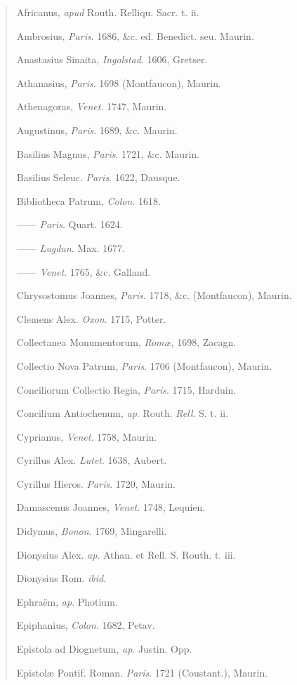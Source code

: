 \begin{quote}



Africanus, \emph{apud} Routh. Relliqu. Sacr. t. ii.

Ambrosius, \emph{Paris}. 1686, \&c. ed. Benedict. seu. Maurin.

Anastasius Sinaita, \emph{Ingolstad}. 1606, Gretser.

Athanasius, \emph{Paris}. 1698 (Montfaucon), Maurin.

Athenagoras, \emph{Venet}. 1747, Maurin.

Augustinus, \emph{Paris}. 1689, \&c. Maurin.

Basilius Magnus, \emph{Paris}. 1721, \&c. Maurin.

Basilius Seleuc. \emph{Paris}. 1622, Dausque.

Bibliotheca Patrum, \emph{Colon}. 1618.

—— \emph{Paris}. Quart. 1624.

—— \emph{Lugdun}. Max. 1677.

—— \emph{Venet}. 1765, \&c. Galland.

Chrysostomus Joannes, \emph{Paris}. 1718, \&c. (Montfaucon),
Maurin.

Clemens Alex. \emph{Oxon}. 1715, Potter.

Collectanea Monumentorum, \emph{Romæ}, 1698, Zacagn.

Collectio Nova Patrum, \emph{Paris}. 1706 (Montfaucon), Maurin.

Conciliorum Collectio Regia, \emph{Paris}. 1715, Harduin.

Concilium Antiochenum, \emph{ap}. Routh. \emph{Rell}. S. t. ii.

Cyprianus, \emph{Venet}. 1758, Maurin.

Cyrillus Alex. \emph{Lutet}. 1638, Aubert.

Cyrillus Hieros. \emph{Paris}. 1720, Maurin.

Damascenus Joannes, \emph{Venet}. 1748, Lequien.

Didymus, \emph{Bonon}. 1769, Mingarelli.

Dionysius Alex. \emph{ap}. Athan. et Rell. S. Routh. t. iii.

Dionysius Rom. \emph{ibid}.

Ephraëm, \emph{ap}. Photium.

Epiphanius, \emph{Colon}. 1682, Petav.

Epistola ad Diognetum, \emph{ap}. Justin. Opp.

Epistolæ Pontif. Roman. \emph{Paris}. 1721 (Coustant.), Maurin.


\end{quote}
